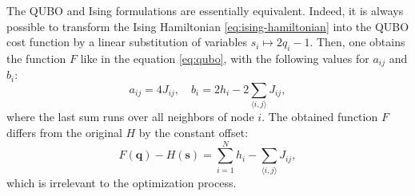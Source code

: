 The QUBO and Ising formulations are essentially equivalent. Indeed, it is
always possible to transform the Ising Hamiltonian \eqref{eq:ising-hamiltonian}
into the QUBO cost function by a linear substitution of variables $s_i \mapsto
  2q_i-1$. Then, one obtains the function $F$ like in the equation
\eqref{eq:qubo}, with the following values for $a_{ij}$ and $b_{i}$:
\begin{equation}
  \label{eq:toQUBO}
  a_{ij}= 4J_{ij},
  \quad
  b_i= 2h_i - 2 \sum_{\langle i, j \rangle} J_{ij},
\end{equation}
where the last sum runs over all neighbors of node $i$. The obtained function
$F$ differs from the original $H$ by the constant offset:
\begin{equation}
  F(\mathbf{q}) - H(\mathbf{s}) =\sum_{i=1}^N h_i - \sum_{\langle i, j \rangle} J_{ij},
\end{equation}
which is irrelevant to the optimization process.

